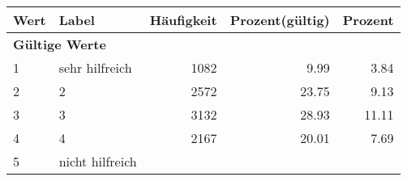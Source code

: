      \begin{longtable}{lXrrr}
     \toprule
     \textbf{Wert} & \textbf{Label} & \textbf{Häufigkeit} & \textbf{Prozent(gültig)} & \textbf{Prozent} \\
     \endhead
     \midrule
     \multicolumn{5}{l}{\textbf{Gültige Werte}}\\

     1 &
     \multicolumn{1}{X}{ sehr hilfreich   } &


       \num{1082} &
       \num[round-mode=places,round-precision=2]{9,99} &
         \num[round-mode=places,round-precision=2]{3,84} \\

     2 &
     \multicolumn{1}{X}{ 2   } &


       \num{2572} &
       \num[round-mode=places,round-precision=2]{23,75} &
         \num[round-mode=places,round-precision=2]{9,13} \\

     3 &
     \multicolumn{1}{X}{ 3   } &


       \num{3132} &
       \num[round-mode=places,round-precision=2]{28,93} &
         \num[round-mode=places,round-precision=2]{11,11} \\

     4 &
     \multicolumn{1}{X}{ 4   } &


       \num{2167} &
       \num[round-mode=places,round-precision=2]{20,01} &
         \num[round-mode=places,round-precision=2]{7,69} \\

     5 &
     \multicolumn{1}{X}{ nicht hilfreich   } &



\end{longtable}
